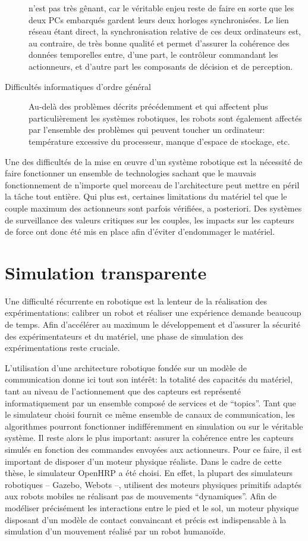 \begin{description}
  n'est pas très gênant, car le véritable enjeu reste de faire en
  sorte que les deux PCs embarqués gardent leurs deux horloges
  synchronisées. Le lien réseau étant direct, la synchronisation
  relative de ces deux ordinateurs est, au contraire, de très bonne
  qualité et permet d'assurer la cohérence des données temporelles
  entre, d'une part, le contrôleur commandant les actionneurs, et
  d'autre part les composants de décision et de perception.
\item[Difficultés informatiques d'ordre général] Au-delà des problèmes
  décrits précédemment et qui affectent plus particulièrement les
  systèmes robotiques, les robots sont également affectés par
  l'ensemble des problèmes qui peuvent toucher un ordinateur:
  température excessive du processeur, manque d'espace de stockage,
  etc.
\end{description}

Une des difficultés de la mise en \oe uvre d'un système robotique est
la nécessité de faire fonctionner un ensemble de technologies sachant
que le mauvais fonctionnement de n'importe quel morceau de
l'architecture peut mettre en péril la tâche tout entière. Qui plus
est, certaines limitations du matériel tel que le couple maximum des
actionneurs sont parfois vérifiées, a posteriori. Des systèmes de
surveillance des valeurs critiques sur les couples, les impacts sur
les capteurs de force ont donc été mis en place afin d'éviter
d'endommager le matériel.


\section{Simulation transparente}


Une difficulté récurrente en robotique est la lenteur de la
réalisation des expérimentations: calibrer un robot et réaliser une
expérience demande beaucoup de temps. Afin d'accélérer au maximum le
développement et d'assurer la sécurité des expérimentateurs et du
matériel, une phase de simulation des expérimentations reste cruciale.


L'utilisation d'une architecture robotique fondée sur un modèle de
communication donne ici tout son intérêt: la totalité des capacités du
matériel, tant au niveau de l'actionnement que des capteurs est
représenté informatiquement par un ensemble composé de services et de
``topics''. Tant que le simulateur choisi fournit ce même ensemble de
canaux de communication, les algorithmes pourront fonctionner
indifféremment en simulation ou sur le véritable système. Il reste
alors le plus important: assurer la cohérence entre les capteurs
simulés en fonction des commandes envoyées aux actionneurs. Pour ce
faire, il est important de disposer d'un moteur physique
réaliste. Dans le cadre de cette thèse, le simulateur
OpenHRP a été choisi. En effet,
la plupart des simulateurs robotiques -- Gazebo, Webots --, utilisent
des moteurs physiques primitifs adaptés aux robots mobiles ne
réalisant pas de mouvements ``dynamiques''. Afin de modéliser
précisément les interactions entre le pied et le sol, un moteur
physique disposant d'un modèle de contact convaincant et précis est
indispensable à la simulation d'un mouvement réalisé par un robot
humanoïde.


